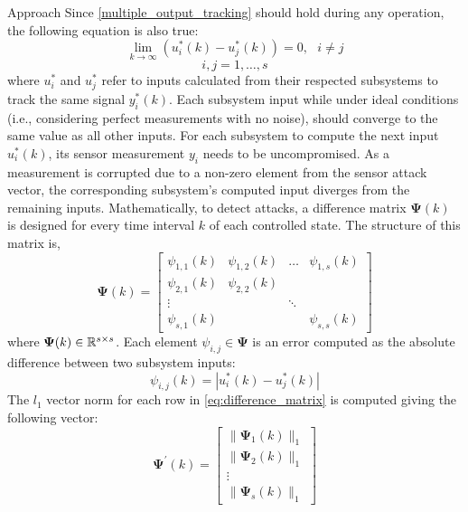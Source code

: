 \begin{section}{Approach}
Since \eqref{multiple_output_tracking} should hold during any operation, the following equation is also true:
\begin{equation}
    \label{eq:u_to_0}
    \lim_{k\to\infty}(u^*_i(k)-u^*_j(k))=0, \text{ }i\neq j
\end{equation}
\begin{equation}
    i,j = 1,\dots,s \nonumber
\end{equation}
where $u^*_i$ and $u^*_j$ refer to inputs calculated from their respected subsystems to track the same signal $y_i^*(k)$. Each subsystem input while under ideal conditions (i.e., considering perfect measurements with no noise), should converge to the same value as all other inputs. For each subsystem to compute the next input $u^*_i(k)$, its sensor measurement $y_i$ needs to be uncompromised. As a measurement is corrupted due to a non-zero element from the sensor attack vector, the corresponding subsystem's computed input diverges from the remaining inputs. Mathematically, to detect attacks, a difference matrix $\bm{\Psi}(k)$ is designed for every time interval $k$ of each controlled state. The structure of this matrix is,
    \begin{equation}
    \label{eq:difference_matrix}
	\bm{\Psi}(k)=\begin{bmatrix} \psi_{1,1}(k) & \psi_{1,2}(k) & \dots & \psi_{1,s}(k) \\ \psi_{2,1}(k) & \psi_{2,2}(k) &  &  \\ \vdots &  & \ddots &  \\ \psi_{s,1}(k) &  &  & \psi_{s,s}(k) \end{bmatrix}
	\end{equation}
where $\bm{\Psi}(k) \in \mathbb{R}^{s\times s}$. Each element $\psi_{i,j}\in\bm{\Psi}$ is an error computed as the absolute difference between two subsystem inputs:
    \begin{equation}
        \label{eq:input_diff}
        \psi_{i,j}(k)=|u^*_i(k)-u^*_j(k)|
    \end{equation}
The $l_1$ vector norm for each row in \eqref{eq:difference_matrix} is computed giving the following vector:
    \begin{equation}
    \label{eq:difference_vector}
	\bm{\Psi^{'}}(k)=\begin{bmatrix} \lVert{\bm{\Psi}_1(k)}\rVert_1 \\ \lVert{\bm{\Psi}_2(k)}\rVert_1 \\ \vdots \\ \lVert{\bm{\Psi}_s(k)}\rVert_1 \end{bmatrix}

\end{equation}
\end{section}
